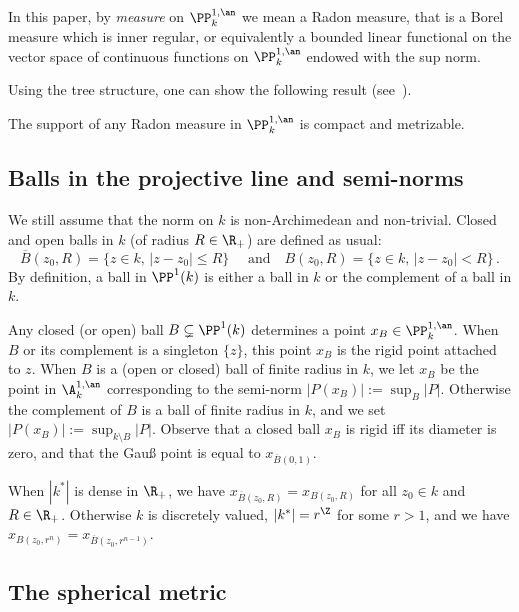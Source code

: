 In this paper, by \emph{measure} on $\PP^{1,\an}_k$ we mean a Radon measure, that is a Borel measure which is inner regular, or equivalently a bounded linear functional on the vector space of continuous functions on $\PP^{1,\an}_k$ endowed with the sup norm.

Using the tree structure, one can show the following result (see~\cite[Lem.~7.15]{valtree}).

\begin{lemm}\label{lem:support}
The support of any Radon measure in $\PP^{1,\an}_k$ is compact and metrizable.
\end{lemm}

\subsection{Balls in the projective line and semi-norms}\label{subsec:balls}

We still assume that the norm on $k$ is non-Archimedean and non-trivial. Closed and open balls in $k$ (of radius $R \in \R_+$) are defined as usual:
\[
\overline{B}(z_0,R)= \{ z\in k, \, | z -z_0| \le R\} \quad\text{ and}\quad {B}(z_0,R)= \{ z\in k, \, | z -z_0| < R\}\,.
\]
By definition, a ball in $\PP^1(k)$ is either a ball in $k$ or the complement of a ball in $k$.

Any closed (or open) ball $B\subsetneq\PP^1(k)$ determines a point $x_B\in \PP^{1,\an}_k$. When $B$ or its complement is a singleton $\{ z\}$, this point $x_B $ is the rigid point attached to $z$. When $B$ is a (open or closed) ball of finite radius in $k$, we let $x_B$ be the point in $\A^{1,\an}_k$ corresponding to the semi-norm $|P(x_B)| := \sup_B |P|$. Otherwise the complement of $B$ is a ball of finite radius in $k$, and we set $|P(x_B)| := \sup_{k\setminus B} |P|$. Observe that a closed ball $x_B$ is rigid iff its diameter is zero, and that the Gau{\ss} point is equal to $x_{\overline{B}(0,1)}$.

\begin{rema}
When $|k^*|$ is dense in $\R_+$, we have $x_{\overline{B}(z_0,R)}=x_{B(z_0,R)}$ for all $z_0\in k$ and $R\in \R_+$. Otherwise $k$ is discretely valued, $|k^*| = r^\Z$ for some $r>1$, and we have $x_{B(z_0,r^n)}= x_{\overline{B}(z_0,r^{n-1})}$.
\end{rema}

\subsection{The spherical metric}

